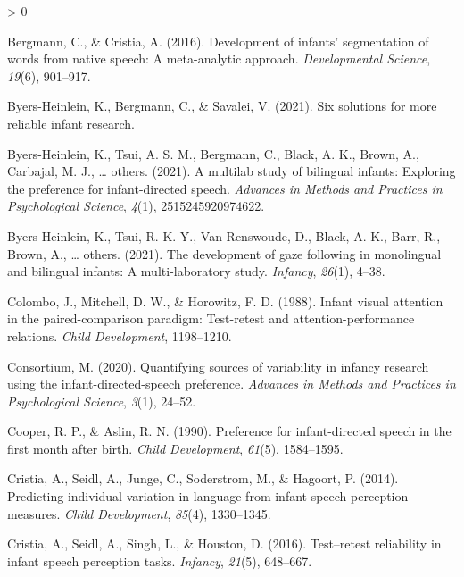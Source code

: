 \documentclass[
  english,
  man,floatsintext]{apa6}
\newlength{\cslhangindent}
\newenvironment{CSLReferences}[2] %
 {%
  \setlength{\parindent}{0pt}
  \ifodd #1 \everypar{\setlength{\hangindent}{\cslhangindent}}\ignorespaces\fi
  \ifnum #2 > 0
  \setlength{\parskip}{#2\baselineskip}
  \fi
 }%
 {}
\begin{document}
\hypertarget{refs}{}
\begin{CSLReferences}{1}{0}
\leavevmode\hypertarget{ref-bergmann2016development}{}%
Bergmann, C., \& Cristia, A. (2016). Development of infants' segmentation of words from native speech: A meta-analytic approach. \emph{Developmental Science}, \emph{19}(6), 901--917.

\leavevmode\hypertarget{ref-byers2021six}{}%
Byers-Heinlein, K., Bergmann, C., \& Savalei, V. (2021). Six solutions for more reliable infant research.

\leavevmode\hypertarget{ref-byers2021multilab}{}%
Byers-Heinlein, K., Tsui, A. S. M., Bergmann, C., Black, A. K., Brown, A., Carbajal, M. J., \ldots{} others. (2021). A multilab study of bilingual infants: Exploring the preference for infant-directed speech. \emph{Advances in Methods and Practices in Psychological Science}, \emph{4}(1), 2515245920974622.

\leavevmode\hypertarget{ref-byers2021development}{}%
Byers-Heinlein, K., Tsui, R. K.-Y., Van Renswoude, D., Black, A. K., Barr, R., Brown, A., \ldots{} others. (2021). The development of gaze following in monolingual and bilingual infants: A multi-laboratory study. \emph{Infancy}, \emph{26}(1), 4--38.

\leavevmode\hypertarget{ref-colombo1988infant}{}%
Colombo, J., Mitchell, D. W., \& Horowitz, F. D. (1988). Infant visual attention in the paired-comparison paradigm: Test-retest and attention-performance relations. \emph{Child Development}, 1198--1210.

\leavevmode\hypertarget{ref-manybabies2020quantifying}{}%
Consortium, M. (2020). Quantifying sources of variability in infancy research using the infant-directed-speech preference. \emph{Advances in Methods and Practices in Psychological Science}, \emph{3}(1), 24--52.

\leavevmode\hypertarget{ref-cooper1990preference}{}%
Cooper, R. P., \& Aslin, R. N. (1990). Preference for infant-directed speech in the first month after birth. \emph{Child Development}, \emph{61}(5), 1584--1595.

\leavevmode\hypertarget{ref-cristia2014predicting}{}%
Cristia, A., Seidl, A., Junge, C., Soderstrom, M., \& Hagoort, P. (2014). Predicting individual variation in language from infant speech perception measures. \emph{Child Development}, \emph{85}(4), 1330--1345.

\leavevmode\hypertarget{ref-cristia2016test}{}%
Cristia, A., Seidl, A., Singh, L., \& Houston, D. (2016). Test--retest reliability in infant speech perception tasks. \emph{Infancy}, \emph{21}(5), 648--667.


\end{CSLReferences}
\end{document}
